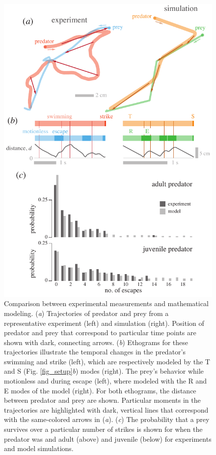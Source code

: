 \documentclass[]{rsos}%
\begin{document}
\pagebreak

\pagebreak

\begin{figure}[!h]
\centering
	\includegraphics[width=4.5in]{fig_trajectories}
\caption{Comparison between experimental measurements and mathematical modeling. 
(\textit{a}) Trajectories of predator and prey from a representative experiment (left) and simulation (right). Position of predator and prey that correspond to particular time points are shown with dark, connecting arrows.
(\textit{b}) Ethograms for these trajectories illustrate the temporal changes in the predator's swimming and strike (left), which are respectively modeled by the T and S (Fig. \ref{fig_setup}\textit{b}) modes (right). 
The prey's behavior while motionless and during escape (left), where modeled with the R and E modes of the model (right).
For both ethograms, the distance between predator and prey are shown.
Particular moments in the trajectories are highlighted with dark, vertical lines that correspond with the same-colored arrows in (\textit{a}).
(\textit{c}) The probability that a prey survives over a particular number of strikes is shown for when the predator was and adult (above) and juvenile (below) for experiments and model simulations.   
}
\label{fig_traj}
\end{figure}
\end{document}
